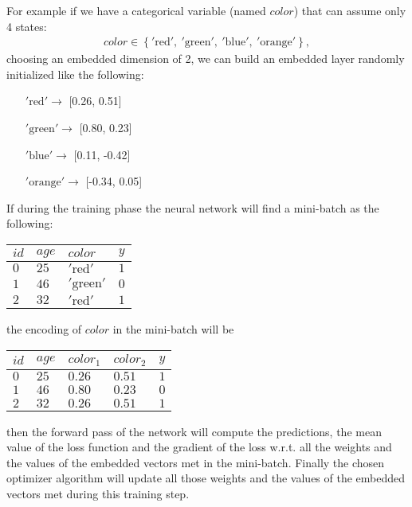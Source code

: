 \documentclass{article}
\begin{document}
For example if we have a categorical variable (named $color$) that can assume only 4 states:
\begin{align*}
    color \in \left\{ '\text{red}',\ '\text{green}',\ '\text{blue}',\ '\text{orange}' \right\},
\end{align*}
choosing an embedded dimension of 2, we can build an embedded layer randomly initialized like the following:
\begin{itemize}[nosep]
    \centering
    \item[$'\text{red}'\rightarrow$] [0.26, 0.51]
    \item[$'\text{green}'\rightarrow$] [0.80, 0.23]
    \item[$'\text{blue}'\rightarrow$] [0.11, -0.42]
    \item[$'\text{orange}'\rightarrow$] [-0.34, 0.05]
\end{itemize}
If during the training phase the neural network will find a mini-batch as the following:
\begin{table}[h!]
  \centering
  \begin{tabular}{llll}
    \toprule
      $id$  & $age$ & $color$ & $y$ \\
      \midrule
      $0$ & $25$ & $'\text{red}'  $ & $1$ \\
      $1$ & $46$ & $'\text{green}'$ & $0$ \\
      $2$ & $32$ & $'\text{red}'  $ & $1$ \\
    \bottomrule
  \end{tabular}
\end{table}

the encoding of $color$ in the mini-batch will be
\begin{table}[h!]
  \centering
  \begin{tabular}{lllll}
    \toprule
      $id$  & $age$ & $color_1$ & $color_2$ & $y$ \\
      \midrule
      $0$ & $25$ & $0.26$ & $0.51$ & $1$ \\
      $1$ & $46$ & $0.80$ & $0.23$ & $0$ \\
      $2$ & $32$ & $0.26$ & $0.51$ & $1$ \\
    \bottomrule
  \end{tabular}
\end{table}

then the forward pass of the network will compute the predictions, the mean value of the loss function and the gradient of the loss w.r.t. all the weights and the values of the embedded vectors met in the mini-batch. Finally the chosen optimizer algorithm will update all those weights and the values of the embedded vectors met during this training step.
\end{document}
